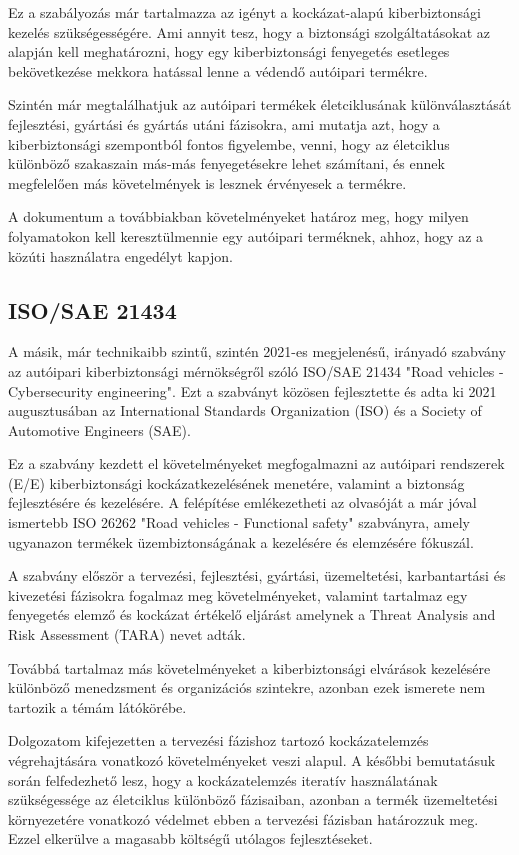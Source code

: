 Ez a szabályozás már tartalmazza az igényt a kockázat-alapú kiberbiztonsági kezelés szükségességére. Ami annyit tesz, hogy a biztonsági szolgáltatásokat az alapján kell meghatározni, hogy egy kiberbiztonsági fenyegetés esetleges bekövetkezése mekkora hatással lenne a védendő autóipari termékre.

Szintén már megtalálhatjuk az autóipari termékek életciklusának különválasztását fejlesztési, gyártási és gyártás utáni fázisokra, ami mutatja azt, hogy a kiberbiztonsági szempontból fontos figyelembe, venni, hogy az életciklus különböző szakaszain más-más fenyegetésekre lehet számítani, és ennek megfelelően más követelmények is lesznek érvényesek a termékre.

A dokumentum a továbbiakban követelményeket határoz meg, hogy milyen folyamatokon kell keresztülmennie egy autóipari terméknek, ahhoz, hogy az a közúti használatra engedélyt kapjon. 

\subsection{ISO/SAE 21434}

A másik, már technikaibb szintű, szintén 2021-es megjelenésű, irányadó szabvány az autóipari kiberbiztonsági mérnökségről szóló ISO/SAE 21434 "Road vehicles - Cybersecurity engineering"\cite{ISO21434}. Ezt a szabványt közösen fejlesztette és adta ki 2021 augusztusában az International Standards Organization (ISO) és a Society of Automotive Engineers (SAE).

Ez a szabvány kezdett el követelményeket megfogalmazni az autóipari rendszerek (E/E) kiberbiztonsági kockázatkezelésének menetére, valamint a biztonság fejlesztésére és kezelésére. A felépítése emlékezetheti az olvasóját a már jóval ismertebb ISO 26262 "Road vehicles - Functional safety" szabványra, amely ugyanazon termékek üzembiztonságának a kezelésére és elemzésére fókuszál.

A szabvány először a tervezési, fejlesztési, gyártási, üzemeltetési, karbantartási és kivezetési fázisokra fogalmaz meg követelményeket, valamint tartalmaz egy fenyegetés elemző és kockázat értékelő eljárást amelynek a Threat Analysis and Risk Assessment (TARA) nevet adták.

Továbbá tartalmaz más követelményeket a kiberbiztonsági elvárások kezelésére különböző menedzsment és organizációs szintekre, azonban ezek ismerete nem tartozik a témám látókörébe.

Dolgozatom kifejezetten a tervezési fázishoz tartozó kockázatelemzés végrehajtására vonatkozó követelményeket veszi alapul. A későbbi bemutatásuk során felfedezhető lesz, hogy a kockázatelemzés iteratív használatának szükségessége az életciklus különböző fázisaiban, azonban a termék üzemeltetési környezetére vonatkozó védelmet ebben a tervezési fázisban határozzuk meg. Ezzel elkerülve a magasabb költségű utólagos fejlesztéseket.

